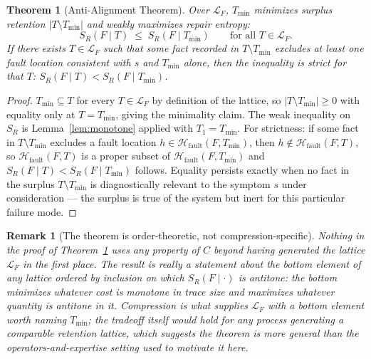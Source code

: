 \documentclass[11pt]{article}
\newtheorem{theorem}[definition]{Theorem}
\newtheorem*{remark}{Remark}
\begin{document}
\begin{theorem}[Anti-Alignment Theorem]
\label{thm:antialign}
Over $\mathcal{L}_F$, $T_{\min}$ minimizes surplus retention $|T\setminus T_{\min}|$ and weakly maximizes repair entropy:
\[
S_R(F\mid T) \;\leq\; S_R(F\mid T_{\min}) \qquad \text{for all } T\in\mathcal{L}_F.
\]
If there exists $T\in\mathcal{L}_F$ such that some fact recorded in $T\setminus T_{\min}$ excludes at least one fault location consistent with $s$ and $T_{\min}$ alone, then the inequality is strict for that $T$: $S_R(F\mid T) < S_R(F\mid T_{\min})$.
\end{theorem}

\begin{proof}
$T_{\min}\subseteq T$ for every $T\in\mathcal{L}_F$ by definition of the lattice, so $|T\setminus T_{\min}|\geq0$ with equality only at $T=T_{\min}$, giving the minimality claim. The weak inequality on $S_R$ is Lemma~\ref{lem:monotone} applied with $T_1=T_{\min}$. For strictness: if some fact in $T\setminus T_{\min}$ excludes a fault location $h\in\mathcal{H}_{\mathrm{fault}}(F,T_{\min})$, then $h\notin\mathcal{H}_{\mathrm{fault}}(F,T)$, so $\mathcal{H}_{\mathrm{fault}}(F,T)$ is a proper subset of $\mathcal{H}_{\mathrm{fault}}(F,T_{\min})$ and $S_R(F\mid T) < S_R(F\mid T_{\min})$ follows. Equality persists exactly when no fact in the surplus $T\setminus T_{\min}$ is diagnostically relevant to the symptom $s$ under consideration — the surplus is true of the system but inert for this particular failure mode.
\end{proof}

\begin{remark}[The theorem is order-theoretic, not compression-specific]
Nothing in the proof of Theorem~\ref{thm:antialign} uses any property of $C$ beyond having generated the lattice $\mathcal{L}_F$ in the first place. The result is really a statement about the bottom element of any lattice ordered by inclusion on which $S_R(F\mid\cdot)$ is antitone: the bottom minimizes whatever cost is monotone in trace size and maximizes whatever quantity is antitone in it. Compression is what supplies $\mathcal{L}_F$ with a bottom element worth naming $T_{\min}$; the tradeoff itself would hold for any process generating a comparable retention lattice, which suggests the theorem is more general than the operators-and-expertise setting used to motivate it here.
\end{remark}
\end{document}
